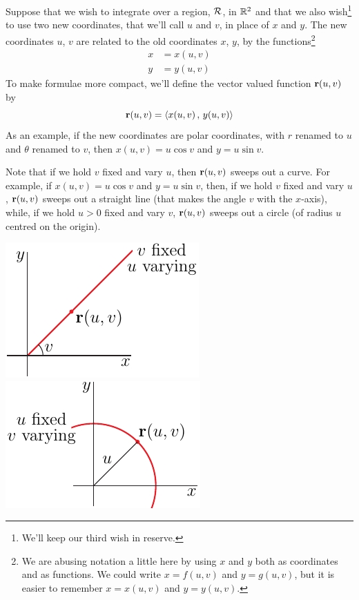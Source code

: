 Suppose that we wish to integrate over a region, $\mathcal{R}$, in $\mathbb{R}^2$ and that
we also wish\footnote{We'll keep our third wish in reserve.} to use two new coordinates, that we'll call $u$ and $v$, in place 
of $x$ and $y$. The new coordinates $u$, $v$ are related to the old coordinates
$x$, $y$, by the functions\footnote{We are abusing notation a little here by
using $x$ and $y$ both as coordinates and as functions. We could
write $x=f(u,v)$ and $y=g(u,v)$, but it is easier to remember
$x=x(u,v)$ and $y=y(u,v)$.}
\begin{align*}
x&=x(u,v) \\
y&=y(u,v)
\end{align*}
To make formulae more compact, we'll define the vector valued function 
$\mathbf{r}(u,v)$ by
\begin{equation*}
\mathbf{r}(u,v) = \left< x(u,v) \,,\, y(u,v) \right>
\end{equation*}
As an example, if the new coordinates are polar coordinates, with $r$
renamed to $u$ and $\theta$ renamed to $v$, then
$x(u,v) = u\cos v$ and $y=u\sin v$.


Note that if we hold $v$ fixed and vary $u$, then $\mathbf{r}(u,v)$ sweeps out a curve.
For example, if $x(u,v) = u\cos v$ and $y=u\sin v$, then, if we hold
$v$ fixed and vary $u$, $\mathbf{r}(u,v)$ sweeps out a straight line (that makes
the angle $v$ with the $x$-axis), while, if we hold
$u>0$ fixed and vary $v$, $\mathbf{r}(u,v)$ sweeps out a circle (of radius $u$
centred on the origin).
\begin{efig}
\begin{center}
    \includegraphics{polarU.pdf}\qquad
    \includegraphics{polarV.pdf}
\end{center}
\end{efig}


